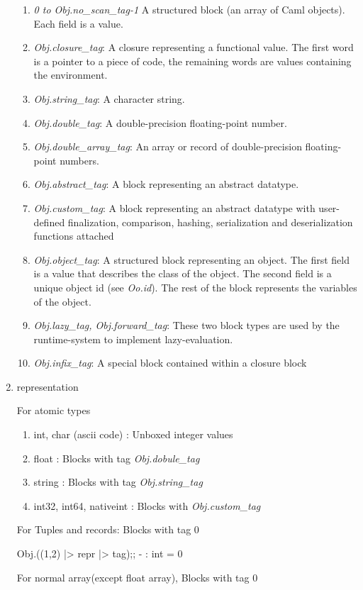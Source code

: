 \begin{enumerate}
\begin{enumerate}
\item \textit{0 to Obj.no\_scan\_tag-1} 
  A structured block (an array of Caml objects). Each field is a value.
\item \textit{Obj.closure\_tag}: A closure representing a functional value. The
first word is a pointer to a piece of code, the remaining words are
values containing the environment.
\item \textit{Obj.string\_tag}: A character string.
\item \textit{Obj.double\_tag}: A double-precision floating-point number.
\item \textit{Obj.double\_array\_tag}: An array or record of double-precision
floating-point numbers.
\item \textit{Obj.abstract\_tag}: A block representing an abstract datatype.
\item \textit{Obj.custom\_tag}: A block representing an abstract datatype with
  user-defined finalization, comparison, hashing, serialization and
  deserialization functions attached
\item \textit{Obj.object\_tag}: A structured block representing an object. The first
  field is a value that describes the class of the object. The second
  field is a unique object id (see \textit{Oo.id}). The rest of the block
  represents the variables of the object.
\item \textit{Obj.lazy\_tag, Obj.forward\_tag}: These two block types
  are used by the runtime-system to implement lazy-evaluation.
\item \textit{Obj.infix\_tag}: A special block contained within a
  closure block  
\end{enumerate}

\item representation

  For atomic types
  \begin{enumerate}
  \item int, char (ascii code) : Unboxed integer values
  \item float : Blocks with tag \textit{Obj.dobule\_tag}
  \item string : Blocks with tag \textit{Obj.string\_tag}
  \item int32, int64, nativeint : Blocks with \textit{Obj.custom\_tag}
  \end{enumerate}
  For Tuples and records: Blocks with tag 0
  \begin{alternate}
Obj.((1,2) |> repr |> tag);;
- : int = 0    
\end{alternate}
For normal array(except float array), Blocks with tag 0


\end{enumerate}
